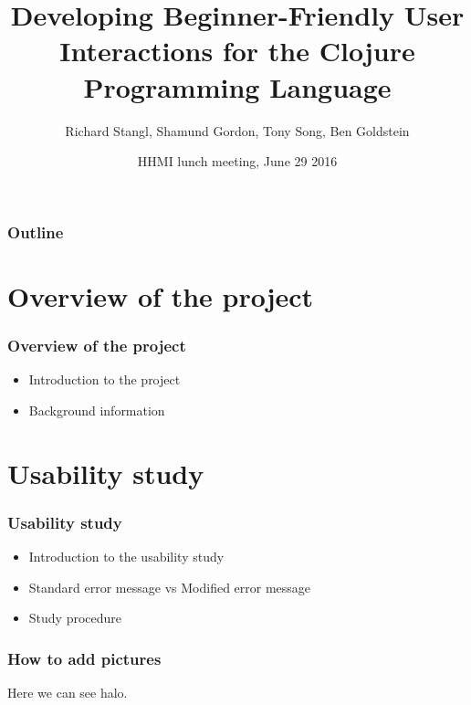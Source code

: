 \documentclass{beamer}
\begin{document}
\title{Developing Beginner-Friendly User Interactions for the Clojure Programming Language}
\author{Richard Stangl, Shamund Gordon, Tony Song, Ben Goldstein}
\date[]  
{HHMI lunch meeting, June 29 2016}

\begin{frame}
  \titlepage
\end{frame}


\begin{frame}

\frametitle{Outline}
\tableofcontents
\end{frame}

\section{Overview of the project}

\begin{frame}
  \frametitle{Overview of the project}
\begin{itemize}
\item Introduction to the project 
\item Background information
\end{itemize}
\end{frame}




\section{Usability study}

\begin{frame}
  \frametitle{Usability study}
\begin{itemize}
\item Introduction to the usability study 
\item Standard error message vs Modified error message
\item Study procedure
\end{itemize}
\end{frame}

\begin{frame}
  \frametitle{How to add pictures}
\begin{figure}
\end{figure}

Here we can see halo. 
\end{frame}
\end{document}
